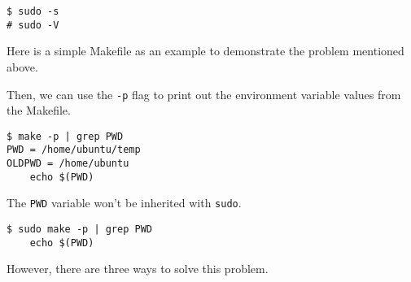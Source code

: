 \documentclass[10pt, oneside]{book}
\begin{document}
\begin{verbatim}
$ sudo -s
# sudo -V
\end{verbatim}

Here is a simple Makefile as an example to demonstrate the problem mentioned above.


Then, we can use the \verb|-p| flag to print out the environment variable values from the Makefile.

\begin{verbatim}
$ make -p | grep PWD
PWD = /home/ubuntu/temp
OLDPWD = /home/ubuntu
	echo $(PWD)
\end{verbatim}

The \verb|PWD| variable won't be inherited with \verb|sudo|.

\begin{verbatim}
$ sudo make -p | grep PWD
	echo $(PWD)
\end{verbatim}

However, there are three ways to solve this problem.
\end{document}
